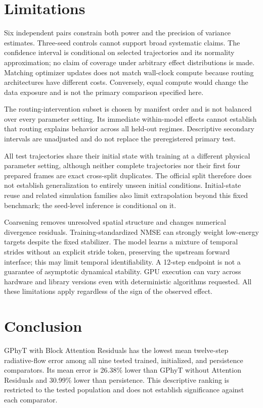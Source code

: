\section{Limitations}
Six independent pairs constrain both power and the precision of variance estimates. Three-seed controls cannot support broad systematic claims. The confidence interval is conditional on selected trajectories and its normality approximation; no claim of coverage under arbitrary effect distributions is made. Matching optimizer updates does not match wall-clock compute because routing architectures have different costs. Conversely, equal compute would change the data exposure and is not the primary comparison specified here.

The routing-intervention subset is chosen by manifest order and is not balanced over every parameter setting. Its immediate within-model effects cannot establish that routing explains behavior across all held-out regimes. Descriptive secondary intervals are unadjusted and do not replace the preregistered primary test.

All test trajectories share their initial state with training at a different physical parameter setting, although neither complete trajectories nor their first four prepared frames are exact cross-split duplicates. The official split therefore does not establish generalization to entirely unseen initial conditions. Initial-state reuse and related simulation families also limit extrapolation beyond this fixed benchmark; the seed-level inference is conditional on it.

Coarsening removes unresolved spatial structure and changes numerical divergence residuals. Training-standardized NMSE can strongly weight low-energy targets despite the fixed stabilizer. The model learns a mixture of temporal strides without an explicit stride token, preserving the upstream forward interface; this may limit temporal identifiability. A 12-step endpoint is not a guarantee of asymptotic dynamical stability. GPU execution can vary across hardware and library versions even with deterministic algorithms requested\cite{pytorchrepro}. All these limitations apply regardless of the sign of the observed effect.

\section{Conclusion}
GPhyT with Block Attention Residuals has the lowest mean twelve-step radiative-flow error among all nine tested trained, initialized, and persistence comparators. Its mean error is 26.38\% lower than GPhyT without Attention Residuals and 30.99\% lower than persistence. This descriptive ranking is restricted to the tested population and does not establish significance against each comparator.

